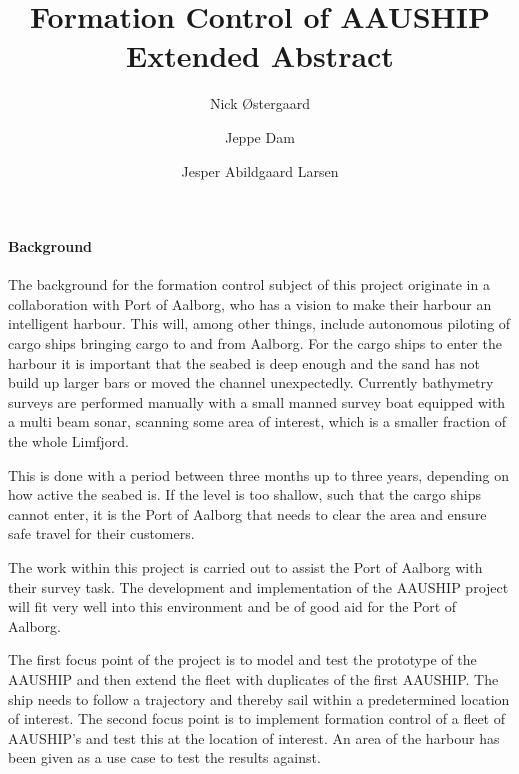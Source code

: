 \documentclass[a4paper,12pt]{article}
\begin{document}
\title{\vspace{-2cm}Formation Control of AAUSHIP\\
\vspace{0.3cm}\small{Extended Abstract}}
\author{Nick Østergaard \and Jeppe Dam \and Jesper Abildgaard Larsen}
\maketitle


\paragraph{Background}
The background for the formation control subject of this project
originate in a collaboration with Port of Aalborg, who has a vision to
make their harbour an intelligent harbour. This will, among other
things, include autonomous piloting of cargo ships bringing cargo to and from
Aalborg. For the cargo ships to enter the harbour it is important that
the seabed is deep enough and the sand has not build up larger bars or
moved the channel unexpectedly.  Currently bathymetry surveys are
performed manually with a small manned survey boat equipped with a
multi beam sonar, scanning some area of interest, which is a smaller
fraction of the whole Limfjord.

This is done with a period between three months up to three years,
depending on how active the seabed is. If the level is too shallow,
such that the cargo ships cannot enter, it is the Port of Aalborg that
needs to clear the area and ensure safe travel for their customers.

The work within this project is carried out to assist the Port of
Aalborg with their survey task. The development and implementation of
the AAUSHIP project will fit very well into this environment and be of
good aid for the Port of Aalborg.

The first focus point of the project is to model and test the
prototype of the AAUSHIP and then extend the fleet with duplicates of
the first AAUSHIP. The ship needs to follow a trajectory and thereby
sail within a predetermined location of interest. The second focus
point is to implement formation control of a fleet of AAUSHIP's and
test this at the location of interest. An area of the harbour has been
given as a use case to test the results against.
\end{document}

